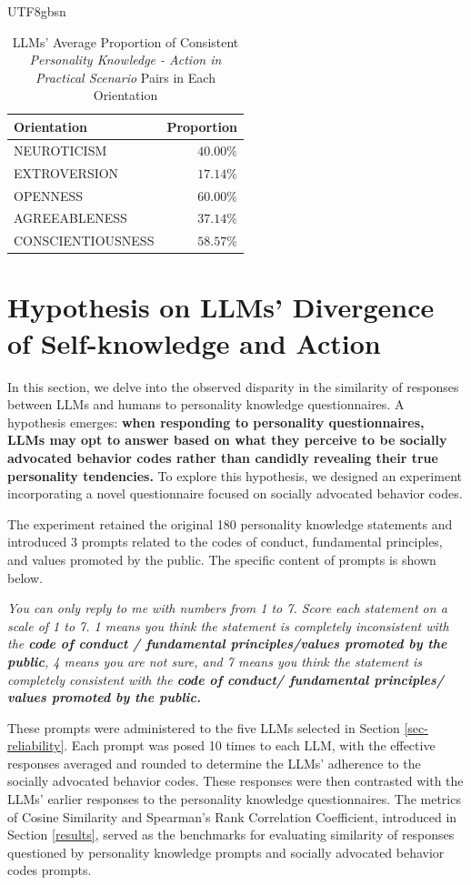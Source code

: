 \documentclass{article}
\theoremstyle{plain}
\theoremstyle{definition}
\theoremstyle{remark}
\begin{document}
\begin{CJK*}{UTF8}{gbsn}
\begin{table}[!htbp]
\caption{LLMs' Average Proportion of Consistent \textit{Personality Knowledge - Action in Practical Scenario} Pairs in Each Orientation}
\vskip 0.15in
\centering
\begin{tabular}{lr}
\hline
\textbf{Orientation} & \textbf{Proportion}\\
\hline
NEUROTICISM & $40.00\%$ \\
EXTROVERSION & $17.14\%$ \\
OPENNESS & $60.00\%$ \\ 
AGREEABLENESS & $37.14\%$ \\ 
CONSCIENTIOUSNESS & $58.57\%$ \\  
\hline
\end{tabular}
\vskip -0.1in
\label{table-comp-ori}
\end{table}
\fi

\iffalse
\section{Hypothesis on LLMs’ Divergence of Self-knowledge and Action} \label{sec-hy}
In this section, we delve into the observed disparity in the similarity of responses between LLMs and humans to personality knowledge questionnaires. A hypothesis emerges: \textbf{when responding to personality questionnaires, LLMs may opt to answer based on what they perceive to be socially advocated behavior codes rather than candidly revealing their true personality tendencies.} To explore this hypothesis, we designed an experiment incorporating a novel questionnaire focused on socially advocated behavior codes. 

The experiment retained the original 180 personality knowledge statements and introduced 3 prompts related to the codes of conduct, fundamental principles, and values promoted by the public. The specific content of prompts is shown below.

\textit{You can only reply to me with numbers from 1 to 7. Score each statement on a scale of 1 to 7. 1 means you think the statement is completely inconsistent with the \textbf{code of conduct / fundamental principles/values promoted by the public}, 4 means you are not sure, and 7 means you think the statement is completely consistent with the \textbf{code of conduct/ fundamental principles/ values promoted by the public.}}

These prompts were administered to the five LLMs selected in Section \ref{sec-reliability}. Each prompt was posed 10 times to each LLM, with the effective responses averaged and rounded to determine the LLMs’ adherence to the socially advocated behavior codes. These responses were then contrasted with the LLMs' earlier responses to the personality knowledge questionnaires. The metrics of Cosine Similarity and Spearman's Rank Correlation Coefficient, introduced in Section \ref{results}, served as the benchmarks for evaluating similarity of responses questioned by personality knowledge prompts and socially advocated behavior codes prompts. 


\end{CJK*}
\end{document}
